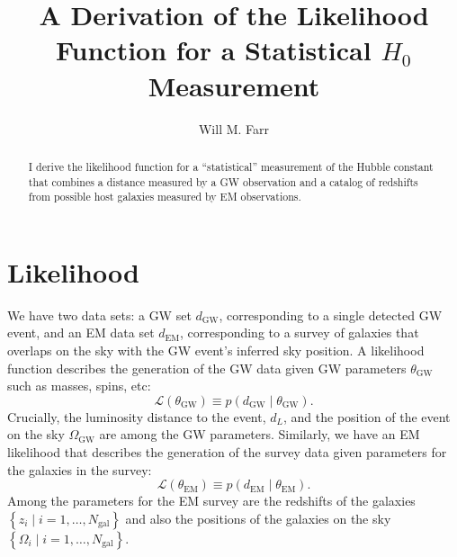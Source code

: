 \documentclass[modern]{aastex62}
\newcommand{\dEM}{d_{\mathrm{EM}}}
\newcommand{\dGW}{d_{\mathrm{GW}}}
\newcommand{\Ngal}{N_{\mathrm{gal}}}
\newcommand{\OGW}{\Omega_{\mathrm{GW}}}
\newcommand{\thetaEM}{\theta_{\mathrm{EM}}}
\newcommand{\thetaGW}{\theta_{\mathrm{GW}}}
\begin{document}
\title{A Derivation of the Likelihood Function for a Statistical $H_0$
Measurement}

\author{Will M. Farr}





\begin{abstract}
%
  I derive the likelihood function for a ``statistical'' measurement of the
  Hubble constant that combines a distance measured by a \ac{GW} observation and
  a catalog of redshifts from possible host galaxies measured by \ac{EM}
  observations.
%
\end{abstract}

\section{Likelihood}

We have two data sets: a \ac{GW} set $\dGW$, corresponding to a single detected
\ac{GW} event, and an \ac{EM} data set $\dEM$, corresponding to a survey of
galaxies that overlaps on the sky with the \ac{GW} event's inferred sky
position.  A likelihood function describes the generation of the \ac{GW} data
given \ac{GW} parameters $\thetaGW$ such as masses, spins, etc:
%
\begin{equation}
    \mathcal{L}\left( \thetaGW \right) \equiv p\left( \dGW \mid \thetaGW \right).
\end{equation}
%
Crucially, the luminosity distance to the event, $d_L$, and the position of the
event on the sky $\OGW$ are among the \ac{GW} parameters.  Similarly, we have an
\ac{EM} likelihood that describes the generation of the survey data given
parameters for the galaxies in the survey:
%
\begin{equation}
    \mathcal{L} \left( \thetaEM \right) \equiv p\left( \dEM \mid \thetaEM \right).
\end{equation}
%
Among the parameters for the \ac{EM} survey are the redshifts of the galaxies
$\left\{ z_i \mid i = 1, \ldots, \Ngal \right\}$ and also the positions of the
galaxies on the sky $\left\{ \Omega_i \mid i = 1, \ldots, \Ngal \right\}$.
\end{document}
